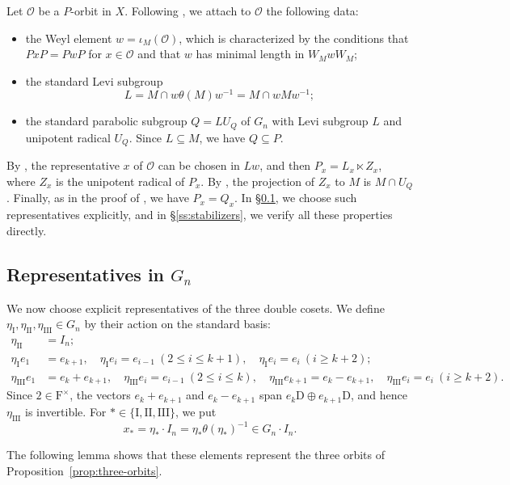 \documentclass[11pt]{amsart}
\numberwithin{equation}{section}
\theoremstyle{plain}
\theoremstyle{definition}
\theoremstyle{remark}
\begin{document}
Let $\mathcal O$ be a $P$-orbit in $X$. Following \cite[\S3]{Off17}, we attach to $\mathcal O$ the following data:
\begin{itemize}
	\item the Weyl element $w=\iota_M(\mathcal O)$, which is characterized by the conditions that $PxP=PwP$ for $x\in\mathcal O$ and that $w$ has minimal length in $W_MwW_M$;
	\item the standard Levi subgroup
	$$
	L=M\cap w\theta(M)w^{-1}=M\cap wMw^{-1};
	$$
	\item the standard parabolic subgroup $Q=LU_Q$ of $G_n$ with Levi subgroup $L$ and unipotent radical $U_Q$. Since $L\subseteq M$, we have $Q\subseteq P$.
\end{itemize}
By \cite[Lemma 3.2]{Off17}, the representative $x$ of $\mathcal O$ can be chosen in $Lw$, and then $P_x=L_x\ltimes Z_x$, where $Z_x$ is the unipotent radical of $P_x$. By \cite[Lemma 3.3]{Off17}, the projection of $Z_x$ to $M$ is $M\cap U_Q$. Finally, as in the proof of \cite[Proposition 4.1]{Off17}, we have $P_x=Q_x$. In \S\ref{ss:representatives}, we choose such representatives explicitly, and in \S\ref{ss:stabilizers}, we verify all these properties directly.

\subsection{Representatives in \texorpdfstring{$G_n$}{Gn}}\label{ss:representatives}

We now choose explicit representatives of the three double cosets. We define $\eta_{\mathrm I},\eta_{\mathrm{II}},\eta_{\mathrm{III}}\in G_n$ by their action on the standard basis:
\begin{align*}
	\eta_{\mathrm{II}}&=I_n;\\
	\eta_{\mathrm I}e_1&=e_{k+1},\quad \eta_{\mathrm I}e_i=e_{i-1}\ (2\le i\le k+1),\quad \eta_{\mathrm I}e_i=e_i\ (i\ge k+2);\\
	\eta_{\mathrm{III}}e_1&=e_k+e_{k+1},\quad \eta_{\mathrm{III}}e_i=e_{i-1}\ (2\le i\le k),\quad \eta_{\mathrm{III}}e_{k+1}=e_k-e_{k+1},\quad \eta_{\mathrm{III}}e_i=e_i\ (i\ge k+2).
\end{align*}
Since $2\in \mathrm{F}^\times$, the vectors $e_k+e_{k+1}$ and $e_k-e_{k+1}$ span $e_k\mathrm{D}\oplus e_{k+1}\mathrm{D}$, and hence $\eta_{\mathrm{III}}$ is invertible. For $*\in\{\mathrm I,\mathrm{II},\mathrm{III}\}$, we put
$$
x_*=\eta_*\cdot I_n=\eta_*\theta(\eta_*)^{-1}\in G_n\cdot I_n.
$$

The following lemma shows that these elements represent the three orbits of Proposition~\ref{prop:three-orbits}.
\end{document}
